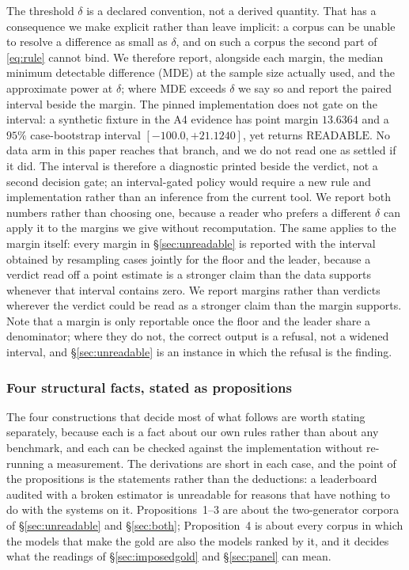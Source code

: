 \documentclass{article}
\begin{document}
The threshold $\delta$ is a declared convention, not a derived quantity. That has a consequence we make explicit rather than leave implicit: a corpus can be unable to resolve a difference as small as $\delta$, and on such a corpus the second part of \eqref{eq:rule} cannot bind. We therefore report, alongside each margin, the median minimum detectable difference (MDE) at the sample size actually used, and the approximate power at $\delta$; where MDE exceeds $\delta$ we say so and report the paired interval beside the margin. The pinned implementation does not gate on the interval: a synthetic fixture in the A4 evidence has point margin $13.6364$ and a $95\%$ case-bootstrap interval $[-100.0,+21.1240]$, yet returns $\mathrm{READABLE}$. No data arm in this paper reaches that branch, and we do not read one as settled if it did. The interval is therefore a diagnostic printed beside the verdict, not a second decision gate; an interval-gated policy would require a new rule and implementation rather than an inference from the current tool. We report both numbers rather than choosing one, because a reader who prefers a different $\delta$ can apply it to the margins we give without recomputation. The same applies to the margin itself: every margin in \S\ref{sec:unreadable} is reported with the interval obtained by resampling cases jointly for the floor and the leader, because a verdict read off a point estimate is a stronger claim than the data supports whenever that interval contains zero. We report margins rather than verdicts wherever the verdict could be read as a stronger claim than the margin supports. Note that a margin is only reportable once the floor and the leader share a denominator; where they do not, the correct output is a refusal, not a widened interval, and \S\ref{sec:unreadable} is an instance in which the refusal is the finding.

\subsubsection{Four structural facts, stated as propositions}
\label{sec:props} The four constructions that decide most of what follows are worth stating separately, because each is a fact about our own rules rather than about any benchmark, and each can be checked against the implementation without re-running a measurement. The derivations are short in each case, and the point of the propositions is the statements rather than the deductions: a leaderboard audited with a broken estimator is unreadable for reasons that have nothing to do with the systems on it. Propositions~1--3 are about the two-generator corpora of \S\ref{sec:unreadable} and \S\ref{sec:both}; Proposition~4 is about every corpus in which the models that make the gold are also the models ranked by it, and it decides what the readings of \S\ref{sec:imposedgold} and \S\ref{sec:panel} can mean.
\end{document}

